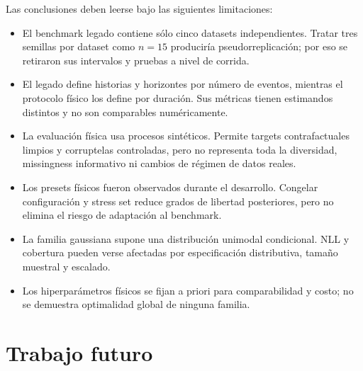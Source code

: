 Las conclusiones deben leerse bajo las siguientes limitaciones:
\begin{itemize}
    \item El benchmark legado contiene sólo cinco datasets independientes. Tratar tres semillas por dataset como $n=15$ produciría pseudorreplicación; por eso se retiraron sus intervalos y pruebas a nivel de corrida.
    \item El legado define historias y horizontes por número de eventos, mientras el protocolo físico los define por duración. Sus métricas tienen estimandos distintos y no son comparables numéricamente.
    \item La evaluación física usa procesos sintéticos. Permite targets contrafactuales limpios y corruptelas controladas, pero no representa toda la diversidad, missingness informativo ni cambios de régimen de datos reales.
    \item Los presets físicos fueron observados durante el desarrollo. Congelar configuración y stress set reduce grados de libertad posteriores, pero no elimina el riesgo de adaptación al benchmark.
    \item La familia gaussiana supone una distribución unimodal condicional. NLL y cobertura pueden verse afectadas por especificación distributiva, tamaño muestral y escalado.
    \item Los hiperparámetros físicos se fijan a priori para comparabilidad y costo; no se demuestra optimalidad global de ninguna familia.
\end{itemize}

\section{Trabajo futuro}
\label{sec:trabajo-futuro}

